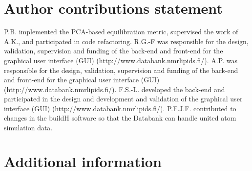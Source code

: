 \documentclass[fleqn,10pt]{wlscirep}
\begin{document}
\section*{Author contributions statement}

P.B. implemented the PCA-based equilibration metric, supervised the work of A.K., and participated in code refactoring.
R.G.-F was responsible for the design, validation, supervision and funding of the back-end and front-end for the graphical user interface (GUI) (http://www.databank.nmrlipids.fi/).
A.P. was responsible for the design, validation, supervision and funding of the back-end and front-end for the graphical user interface (GUI) (http://www.databank.nmrlipids.fi/).
F.S.-L. developed the back-end and participated in the design and development and validation of the graphical user interface (GUI) (http://www.databank.nmrlipids.fi/).
P.F.J.F. contributed to changes in the buildH software so that the Databank can handle united atom simulation data.


\section*{Additional information}





\end{document}

